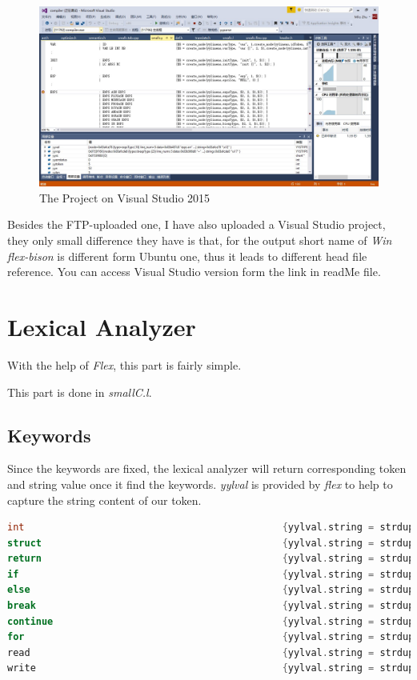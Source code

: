 \documentclass{article}
\begin{document}
\begin{figure}[h]
\begin{center}
\includegraphics[width=1\textwidth]{IDE.jpg} %
\caption{The Project on Visual Studio 2015}
\end{center}
\end{figure}

Besides the FTP-uploaded one, I have also uploaded a Visual Studio project, they only small difference they have is that, for the output short name of \textit{Win flex-bison} is different form Ubuntu one, thus it leads to different head file reference. You can access Visual Studio version form the link in readMe file.


\section{Lexical Analyzer}

With the help of \textit{Flex}, this part is fairly simple. 

This part is done in \textit{smallC.l}.

\subsection{Keywords}
Since the keywords are fixed, the lexical analyzer will return corresponding token and string value once it find the keywords. \emph{yylval} is provided by \textit{flex} to help to capture the string content of our token. 

\begin{lstlisting}[language = C] 
int												{yylval.string = strdup(yytext); return TYPE;}
struct											{yylval.string = strdup(yytext); return STRUCT;}
return											{yylval.string = strdup(yytext); return RETURN;}
if												{yylval.string = strdup(yytext); return IF;}
else											{yylval.string = strdup(yytext); return ELSE;}
break											{yylval.string = strdup(yytext); return BREAK;}
continue										{yylval.string = strdup(yytext); return CONT;}
for												{yylval.string = strdup(yytext); return FOR;}
read											{yylval.string = strdup(yytext); return READ;}
write											{yylval.string = strdup(yytext); return WRITE;}
\end{lstlisting}
\end{document}
